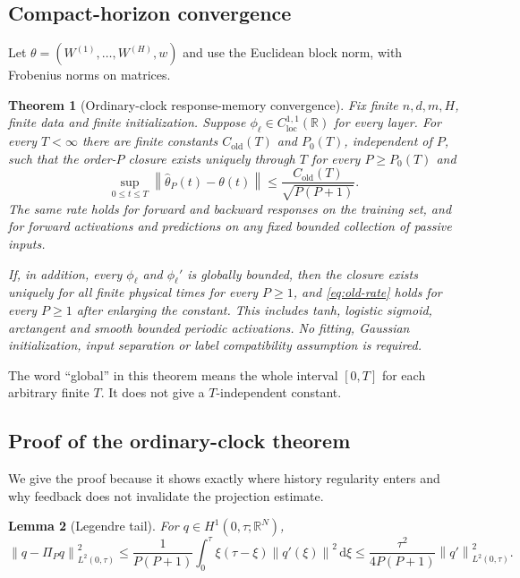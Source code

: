 \documentclass[11pt]{article}
\newtheorem{theorem}{Theorem}[section]
\newtheorem{lemma}[theorem]{Lemma}
\theoremstyle{definition}
\theoremstyle{remark}
\newcommand{\R}{\mathbb{R}}
\newcommand{\norm}[1]{\left\lVert #1\right\rVert}
\newcommand{\dd}{\,\mathrm{d}}
\begin{document}
\subsection{Compact-horizon convergence}

Let $\theta=(W^{(1)},\ldots,W^{(H)},w)$ and use the Euclidean block norm, with
Frobenius norms on matrices.

\begin{theorem}[Ordinary-clock response-memory convergence]
\label{thm:old}
Fix finite $n,d,m,H$, finite data and finite initialization.  Suppose
$\phi_\ell\in C^{1,1}_{\mathrm{loc}}(\R)$ for every layer.  For every
$T<\infty$ there are finite constants $C_{\mathrm{old}}(T)$ and $P_0(T)$,
independent of $P$, such that the order-$P$ closure exists uniquely through
$T$ for every $P\ge P_0(T)$ and
\begin{equation}
 \sup_{0\le t\le T}\norm{\widehat\theta_P(t)-\theta(t)}
 \le \frac{C_{\mathrm{old}}(T)}{\sqrt{P(P+1)}}.       \label{eq:old-rate}
\end{equation}
The same rate holds for forward and backward responses on the training set,
and for forward activations and predictions on any fixed bounded collection
of passive inputs.

If, in addition, every $\phi_\ell$ and $\phi_\ell'$ is globally bounded, then
the closure exists uniquely for all finite physical times for every $P\ge1$,
and \eqref{eq:old-rate} holds for every $P\ge1$ after enlarging the constant.
This includes tanh, logistic sigmoid, arctangent and smooth bounded periodic
activations.  No fitting, Gaussian initialization, input separation or label
compatibility assumption is required.
\end{theorem}

The word ``global'' in this theorem means the whole interval $[0,T]$ for each
arbitrary finite $T$.  It does not give a $T$-independent constant.

\subsection{Proof of the ordinary-clock theorem}

We give the proof because it shows exactly where history regularity enters and
why feedback does not invalidate the projection estimate.

\begin{lemma}[Legendre tail]
\label{lem:legendre}
For $q\in H^1(0,\tau;\R^N)$,
\begin{equation}
 \norm{q-\Pi_Pq}_{L^2(0,\tau)}^2
 \le\frac{1}{P(P+1)}\int_0^\tau \xi(\tau-\xi)
 \norm{q'(\xi)}^2\dd\xi
 \le\frac{\tau^2}{4P(P+1)}\norm{q'}_{L^2(0,\tau)}^2. \label{eq:leg-tail}
\end{equation}
\end{lemma}
\end{document}
